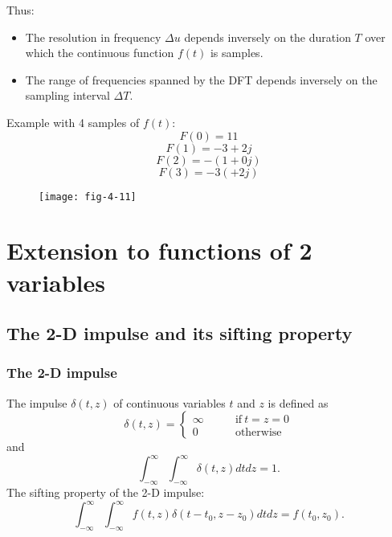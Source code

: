 
\begin{frame}
Thus:
\begin{itemize}
\item The resolution in frequency $\Delta u$ depends inversely on the duration $T$ over which the continuous function $f(t)$ is samples.
\item The range of frequencies spanned by the DFT depends inversely on the sampling interval $\Delta T$.
\end{itemize}
\end{frame}


\begin{frame}
Example with 4 samples of $f(t)$:\\
\[
F(0) = 11
\]
\[
F(1) = -3+2j
\]
\[
F(2) = -(1+0j)
\]
\[
F(3) = -3(+2j)
\]
\begin{figure}
\centering
\texttt{[image: fig-4-11]}
\end{figure}
\end{frame}


\section{Extension to functions of 2 variables}


\subsection{The 2-D impulse and its sifting property}


\begin{frame}
\frametitle{The 2-D impulse}
The impulse $\delta(t,z)$ of continuous variables $t$ and $z$ is defined as
\begin{equation}
\delta(t,z) = \left \{
\begin{split}
\infty & \qquad \text{if}\ t=z=0\\
0 &  \qquad \text{otherwise}
\end{split}
\right .
\end{equation}
and
\begin{equation}
\int_{-\infty}^{\infty} \int_{-\infty}^{\infty} \delta(t,z) dt dz = 1.
\end{equation}
The sifting property of the 2-D impulse:
\begin{equation}
\int_{-\infty}^{\infty} \int_{-\infty}^{\infty} f(t,z) \delta(t-t_{0},z-z_{0}) dt dz = f(t_{0},z_{0}).
\end{equation}
\end{frame}

